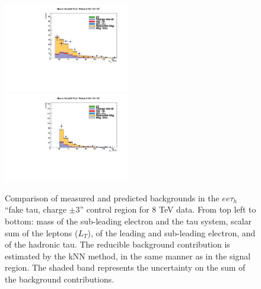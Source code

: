 \begin{figure}
\begin{center}
  \includegraphics[width=0.49\textwidth]{4_Analisys/pics/8TeV/plots/eet/f3/Full_charge3/final-f3-e2Pt-Full.pdf}\\
  \includegraphics[width=0.49\textwidth]{4_Analisys/pics/8TeV/plots/eet/f3/Full_charge3/final-f3-tPt-Full.pdf}
  \caption{Comparison of measured and predicted backgrounds in the $ee\tau_h$ ``fake tau, charge $\pm3$'' control region for 8 TeV data.
  From top left to bottom: mass of the sub-leading electron and the tau system, scalar sum of the leptons \pT ($L_T$), \pT of the leading and sub-leading electron, and \pT of the hadronic tau.
  The reducible background contribution is estimated by the kNN method, in the same manner as in the signal region.
  The shaded band represents the uncertainty on the sum of the background contributions.
  }
  \label{fig:LLT_eet_f3_charge3_control_8TeV}
\end{center}
\end{figure}



